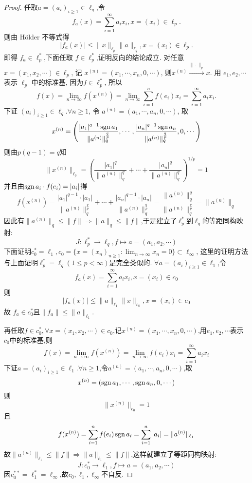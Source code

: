 \begin{proof}
    任取$a=(a_i)_{i\geq1}\in\ell_q$,令
    \[f_a(x)=\sum_{i=1}^{\infty}a_ix_i,x=(x_i)\in\ell_p.\]
    则由 H\"older 不等式得
    \[|f_a(x)|\leq\|x\|_{\ell_p}\|a\|_{\ell_q},x=(x_i)\in\ell_p.\]
    即得 $f_a\in\ell_p^*$,下面任取 $f\in\ell_p^*$,证明反向的结论成立.
    对任意 $x=(x_1,x_2,\cdots)\in\ell_p$,
    记 $x^{(n)}=(x_1,\cdots,x_n,0,\cdots)$, 则$x^{(n)}\xrightarrow{\|\cdot\|_p}x$.
    用 $e_1,e_2,\cdots$ 表示 $\ell_p$ 中的标准基, 因为$f\in\ell_p^*$, 所以
    \[f(x)=\lim_{n\to\infty}f(x^{(n)})=\lim_{n\to\infty}\sum_{i=1}^nf(e_i)x_i=\sum_{i=1}^{\infty}a_ix_i.\]
    下证 $(a_i)_{i\geq1}\in\ell_q.\forall n\geq 1$, 令 $a^{(n)}=(a_1,\cdots,a_n,0,\cdots)$, 取
    \[x^{(n)}=\left(\frac{|a_1|^{q-1}\operatorname{sgn} a_1}{\|a^{(n)}\|^{\frac{q}{p}}_q},\cdots,\frac{|a_n|^{q-1}\operatorname{sgn} a_n}{\|a^{(n)}\|^{\frac{q}{p}}_q},0,\cdots\right)\]
    则由$p(q-1)=q$知
    \[\|x^{(n)}\|_{\ell_p}=\left(\frac{|a_1|^q}{\|a^{(n)}\|^q_q}+\cdots+\frac{|a_n|^q}{\|a^{(n)}\|^q_q}\right)^{1/p}=1\]
    并且由$\operatorname{sgn} a_i\cdot f(e_i)=|a_i|$得
    \[f(x^{(n)})=\frac{|a_1|^{q-1}\cdot|a_1|}{\|a^{(n)}\|^{\frac{q}{p}}_q}+\cdots+\frac{|a_n|^{q-1}\cdot|a_n|}{\|a^{(n)}\|^{\frac{q}{p}}_q}=\frac{\|a^{(n)}\|_q^q}{\|a^{(n)}\|_q^\frac{q}{p}}=\|a^{(n)}\|_q\]
    因此有$\|a^{(n)}\|_q\leq\|f\|\Rightarrow\|a\|_q\leq\|f\|$,于是建立了$\ell_p^*$到$\ell_q$的等距同构映射:
    \[J:\ell_p^*\to\ell_q,f\mapsto a=(a_1,a_2,\cdots)\]
    下面证明$c_0^*=\ell_1,c_0=\{x=(x_n)_{n\geq1}:\lim_{n\to\infty}x_n=0\}\subset\ell_{\infty}$,
    这里的证明方法与上面证明$\ell_p^*=\ell_q(1\leq p<\infty)$是完全类似的.
    $\forall a=(a_i)_{i\geq 1}\in\ell_1$,令
    \[f_a(x)=\sum_{i=1}^{\infty}a_ix_i,x=(x_i)\in c_0\]
    则
    \[|f_a(x)|\leq\|a\|_{\ell_1}\|x\|_{c_0},x=(x_i)\in c_0\]
    故 $f_a\in c_0^*$且$\|f_a\|\leq\|a\|_{\ell_1}$.

    再任取$f\in c_0^*,\forall x=(x_1,x_2,\cdots)\in c_0$,记$x^{(n)}=(x_1,\cdots,x_n,0,\cdots)$,用$e_1,e_2,\cdots$表示$c_0$中的标准基,则
    \[f(x)=\lim_{n\to\infty}f(x^{(n)})=\lim_{n\to\infty}f(e_i)x_i=\sum_{i=1}^{\infty}a_ix_i\]
    下证$a=(a_i)_{i\geq 1}\in\ell_1.\forall n\geq1$,令$a^{(n)}=(a_1,\cdots,a_n,0,\cdots)$,取
    \[x^{(n)}=(\operatorname{sgn} a_1,\cdots,\operatorname{sgn} a_n,0,\cdots)\]
    则\[\|x^{(n)}\|_{c_0}=1\]
    且\[f(x^{(n)})=\sum_{i=1}^nf(e_i)\operatorname{sgn} a_i=\sum_{i=1}^n|a_i|=\|a^{(n)}\|_{\ell_1}\]
    故$\|a^{(n)}\|_{\ell_1}\leq\|f\|\Rightarrow\|a\|_{\ell_1}\leq\|f\|$,这样就建立了等距同构映射:
    \[J:c_0^*\to\ell_1,f\mapsto a=(a_1,a_2,\cdots)\]
    因$c_0^{**}=\ell_1^*=\ell_{\infty}$,故$c_0,\ell_1,\ell_{\infty}$不自反.
\end{proof}



